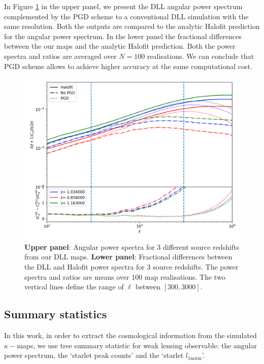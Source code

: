 \documentclass[twocolumn,twocolappendix]{aastex63}
\begin{document}
In Figure \ref{fig:ps_comp} in the upper panel, we present the DLL angular power spectrum complemented by the PGD scheme to a conventional DLL simulation with the same resolution. Both the outputs are compared to the analytic Halofit prediction for the angular power spectrum. In the lower panel the fractional differences between the our maps and the analytic Halofit prediction.  Both the power spectra and ratios are averaged over $N = 100$ realisations.
We can conclude that PGD scheme allows to achieve higher accuracy at the same computational cost.
 


\begin{figure}
    \centering
    \includegraphics[width=\columnwidth]{paper/figures/clshalofit_comp.png}
    \caption{
    \textbf{Upper panel}: Angular power spectra for 3 different source redshifts from
our DLL maps. \textbf{Lower panel}: Fractional differences between the
DLL and Halofit power spectra for 3 source redshifts. The power spectra and ratios are means over 100 map realisations. The two vertical lines define the range of $\ell$ between $[300,3000]$.}
    \label{fig:ps_comp}
\end{figure}



\subsection{Summary statistics}
In this work, in order to extract the cosmological information from the simulated $\kappa-$maps, we use tree summary statistic for weak lensing observable: the angular power spectrum, the `starlet peak counts' and the `starlet $l_{1\text{norm}}$'. 
\end{document}
